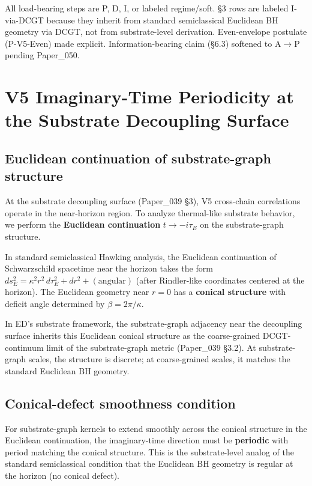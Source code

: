 \documentclass[11pt,a4paper]{article}
\begin{document}
All load-bearing steps are P, D, I, or labeled regime/soft. \S3 rows are labeled I-via-DCGT because they inherit from standard semiclassical Euclidean BH geometry via DCGT, not from substrate-level derivation. Even-envelope postulate (P-V5-Even) made explicit. Information-bearing claim (\S6.3) softened to A$\to$P pending Paper\_050.

\section{V5 Imaginary-Time Periodicity at the Substrate Decoupling Surface}

\subsection{Euclidean continuation of substrate-graph structure}

At the substrate decoupling surface (Paper\_039 \S3), V5 cross-chain correlations operate in the near-horizon region. To analyze thermal-like substrate behavior, we perform the \textbf{Euclidean continuation} $t \to -i\tau_E$ on the substrate-graph structure.

In standard semiclassical Hawking analysis, the Euclidean continuation of Schwarzschild spacetime near the horizon takes the form $ds^2_E = \kappa^2 r^2\,d\tau_E^2 + dr^2 + (\mathrm{angular})$ (after Rindler-like coordinates centered at the horizon). The Euclidean geometry near $r = 0$ has a \textbf{conical structure} with deficit angle determined by $\beta = 2\pi/\kappa$.

In ED's substrate framework, the substrate-graph adjacency near the decoupling surface inherits this Euclidean conical structure as the coarse-grained DCGT-continuum limit of the substrate-graph metric (Paper\_039 \S3.2). At substrate-graph scales, the structure is discrete; at coarse-grained scales, it matches the standard Euclidean BH geometry.

\subsection{Conical-defect smoothness condition}

For substrate-graph kernels to extend smoothly across the conical structure in the Euclidean continuation, the imaginary-time direction must be \textbf{periodic} with period matching the conical structure. This is the substrate-level analog of the standard semiclassical condition that the Euclidean BH geometry is regular at the horizon (no conical defect).
\end{document}
